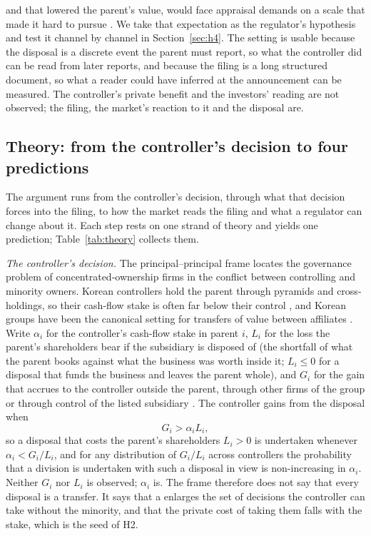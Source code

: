 and that lowered the parent's value, would face appraisal demands on a scale that made it hard to pursue \cite{fsc2022b}. We take that expectation as the regulator's hypothesis and test it channel by channel in Section~\ref{sec:h4}. The setting is usable because the disposal is a discrete event the parent must report, so what the controller did can be read from later reports, and because the filing is a long structured document, so what a reader could have inferred at the announcement can be measured. The controller's private benefit and the investors' reading are not observed; the filing, the market's reaction to it and the disposal are.

\subsection{Theory: from the controller's decision to four predictions}\label{sec:theory}

The argument runs from the controller's decision, through what that decision forces into the filing, to how the market reads the filing and what a regulator can change about it. Each step rests on one strand of theory and yields one prediction; Table~\ref{tab:theory} collects them.

\emph{The controller's decision.} The principal--principal frame \cite{young2008} locates the governance problem of concentrated-ownership firms in the conflict between controlling and minority owners. Korean controllers hold the parent through pyramids and cross-holdings, so their cash-flow stake is often far below their control \cite{laporta1999, claessens2000}, and Korean groups have been the canonical setting for transfers of value between affiliates \cite{bae2002, baek2006, bae2008, joh2003, almeida2011}. Write $\alpha_i$ for the controller's cash-flow stake in parent $i$, $L_i$ for the loss the parent's shareholders bear if the subsidiary is disposed of (the shortfall of what the parent books against what the business was worth inside it; $L_i \le 0$ for a disposal that funds the business and leaves the parent whole), and $G_i$ for the gain that accrues to the controller outside the parent, through other firms of the group or through control of the listed subsidiary \cite{johnson2000, claessens2002, masulis2011}. The controller gains from the disposal when
\begin{equation}\label{eq:pp}
G_i > \alpha_i L_i ,
\end{equation}
so a disposal that costs the parent's shareholders $L_i > 0$ is undertaken whenever $\alpha_i < G_i / L_i$, and for any distribution of $G_i / L_i$ across controllers the probability that a division is undertaken with such a disposal in view is non-increasing in $\alpha_i$. Neither $G_i$ nor $L_i$ is observed; $\alpha_i$ is. The frame therefore does not say that every disposal is a transfer. It says that a \captive{} enlarges the set of decisions the controller can take without the minority, and that the private cost of taking them falls with the stake, which is the seed of H2.

